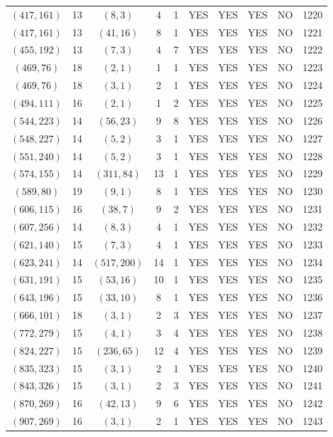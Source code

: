 \begin{longtable}{|c|c|c|c|c|c|c|c|c|c|}
$(417, 161)$ & 13 & $(8, 3)$ & 4 & 1 & YES & YES & YES & NO & 1220\\
$(417, 161)$ & 13 & $(41, 16)$ & 8 & 1 & YES & YES & YES & NO & 1221\\
$(455, 192)$ & 13 & $(7, 3)$ & 4 & 7 & YES & YES & YES & NO & 1222\\
$(469, 76)$ & 18 & $(2, 1)$ & 1 & 1 & YES & YES & YES & NO & 1223\\
$(469, 76)$ & 18 & $(3, 1)$ & 2 & 1 & YES & YES & YES & NO & 1224\\
$(494, 111)$ & 16 & $(2, 1)$ & 1 & 2 & YES & YES & YES & NO & 1225\\
$(544, 223)$ & 14 & $(56, 23)$ & 9 & 8 & YES & YES & YES & NO & 1226\\
$(548, 227)$ & 14 & $(5, 2)$ & 3 & 1 & YES & YES & YES & NO & 1227\\
$(551, 240)$ & 14 & $(5, 2)$ & 3 & 1 & YES & YES & YES & NO & 1228\\
$(574, 155)$ & 14 & $(311, 84)$ & 13 & 1 & YES & YES & YES & NO & 1229\\
$(589, 80)$ & 19 & $(9, 1)$ & 8 & 1 & YES & YES & YES & NO & 1230\\
$(606, 115)$ & 16 & $(38, 7)$ & 9 & 2 & YES & YES & YES & NO & 1231\\
$(607, 256)$ & 14 & $(8, 3)$ & 4 & 1 & YES & YES & YES & NO & 1232\\
$(621, 140)$ & 15 & $(7, 3)$ & 4 & 1 & YES & YES & YES & NO & 1233\\
$(623, 241)$ & 14 & $(517, 200)$ & 14 & 1 & YES & YES & YES & NO & 1234\\
$(631, 191)$ & 15 & $(53, 16)$ & 10 & 1 & YES & YES & YES & NO & 1235\\
$(643, 196)$ & 15 & $(33, 10)$ & 8 & 1 & YES & YES & YES & NO & 1236\\
$(666, 101)$ & 18 & $(3, 1)$ & 2 & 3 & YES & YES & YES & NO & 1237\\
$(772, 279)$ & 15 & $(4, 1)$ & 3 & 4 & YES & YES & YES & NO & 1238\\
$(824, 227)$ & 15 & $(236, 65)$ & 12 & 4 & YES & YES & YES & NO & 1239\\
$(835, 323)$ & 15 & $(3, 1)$ & 2 & 1 & YES & YES & YES & NO & 1240\\
$(843, 326)$ & 15 & $(3, 1)$ & 2 & 3 & YES & YES & YES & NO & 1241\\
$(870, 269)$ & 16 & $(42, 13)$ & 9 & 6 & YES & YES & YES & NO & 1242\\
$(907, 269)$ & 16 & $(3, 1)$ & 2 & 1 & YES & YES & YES & NO & 1243\\

\end{longtable}
